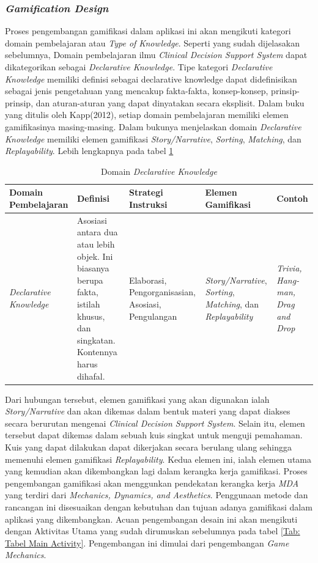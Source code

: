\subsubsection{\textit{Gamification Design}}
Proses pengembangan gamifikasi dalam aplikasi ini akan mengikuti kategori domain pembelajaran atau \textit{Type of Knowledge}. Seperti yang sudah dijelasakan sebelumnya, Domain pembelajaran ilmu \textit{Clinical Decision Support System} dapat dikategorikan sebagai \textit{Declarative Knowledge}.
Tipe kategori \textit{Declarative Knowledge} memiliki definisi sebagai declarative knowledge dapat didefinisikan sebagai jenis pengetahuan yang mencakup fakta-fakta, konsep-konsep, prinsip-prinsip, dan aturan-aturan yang dapat dinyatakan secara eksplisit.
Dalam buku yang ditulis oleh Kapp(2012), setiap domain pembelajaran memiliki elemen gamifikasinya masing-masing. Dalam bukunya menjelaskan domain \textit{Declarative Knowledge} memiliki elemen gamifikasi \textit{Story/Narrative}, \textit{Sorting}, \textit{Matching}, dan \textit{Replayability}.
Lebih lengkapnya pada tabel \ref*{Tab:Declarative-knowledge}
\begin{table}[H]
	\centering
	\caption{Domain \textit{Declarative Knowledge}}
	\begin{tabular}{|p{2.7cm}|p{3cm}|p{2.7cm}|p{2.7cm}|p{2cm}|}
		\hline
		\centering\textbf{Domain Pembelajaran} &\centering\textbf{Definisi}  &\centering\textbf{Strategi Instruksi}  &\centering\textbf{Elemen Gamifikasi} &\multicolumn{1}{m{2cm}|}{\centering \textbf{Contoh}}\\
		\hline
		\textit{Declarative Knowledge} 
		&Asosiasi antara dua atau lebih objek. Ini biasanya berupa fakta, istilah khusus, dan singkatan. Kontennya harus dihafal.
		&Elaborasi, Pengorganisasian, Asosiasi, Pengulangan
		&\textit{Story/Narrative}, \textit{Sorting}, \textit{Matching}, dan \textit{Replayability}
		&\textit{Trivia, Hang-man, Drag and Drop} \\
		\hline
	\end{tabular}
	\label{Tab:Declarative-knowledge}
\end{table}
Dari hubungan tersebut, elemen gamifikasi yang akan digunakan ialah \textit{Story/Narrative} dan akan dikemas dalam bentuk materi yang dapat diakses secara berurutan mengenai \textit{Clinical Decision Support System}. Selain itu, elemen tersebut dapat dikemas dalam sebuah kuis singkat untuk menguji pemahaman.
Kuis yang dapat dilakukan dapat dikerjakan secara berulang ulang sehingga memenuhi elemen gamifikasi \textit{Replayability}. Kedua elemen ini, ialah elemen utama yang kemudian akan dikembangkan lagi dalam kerangka kerja gamifikasi.
Proses pengembangan gamifikasi akan menggunkan pendekatan kerangka kerja \textit{MDA} yang terdiri dari \textit{Mechanics, Dynamics, and Aesthetics}. 
Penggunaan metode dan rancangan ini disesuaikan dengan kebutuhan dan tujuan adanya gamifikasi dalam aplikasi yang dikembangkan.
Acuan pengembangan desain ini akan mengikuti dengan Aktivitas Utama yang sudah dirumuskan sebelumnya pada tabel \ref*{Tab: Tabel Main Activity}.
Pengembangan ini dimulai dari pengembangan \textit{Game Mechanics}.

